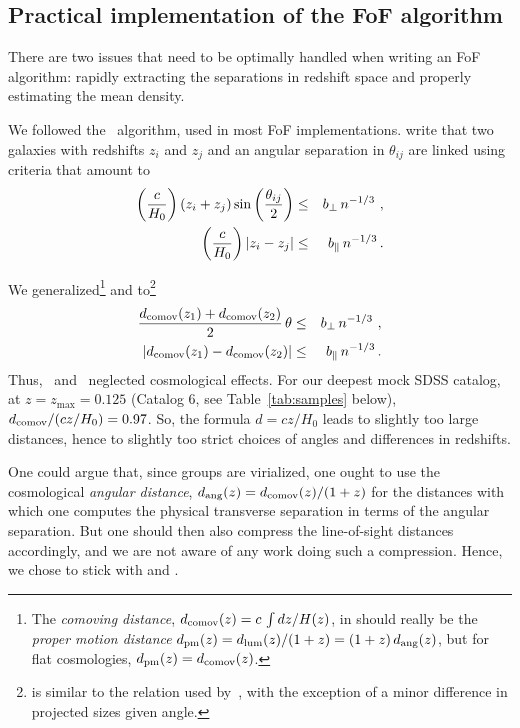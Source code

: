\subsection{Practical implementation of the FoF algorithm}
\label{sec:algo}

There are two issues that need to be optimally handled when writing an FoF
algorithm: rapidly extracting the separations in redshift space and properly
estimating the mean density.

We followed the~\cite{HG82} algorithm, used in most FoF implementations.
\citeauthor{HG82} write that two galaxies with redshifts $z_i$ and $z_j$ and an
angular separation in $\theta_{ij}$ are linked using criteria that amount to
%
\begin{eqnarray}\label{eq:crit1}
    \left({c \over H_0}\right)\left(z_i + z_j\right)\sin\left({\theta_{ij}\over2}\right)
    & \leq & b_\bot \, n^{-1/3} \ , \\
\label{eq:crit2}
    \left({c \over H_0}\right)\left|z_i-z_j\right| &\leq & b_\parallel
    \, n^{-1/3}
\,.
\end{eqnarray}
%

We generalized\footnote{The \emph{comoving distance}, $d_{\rm comov}(z) =
    c\,\int dz/H(z)$, in  should really be the
    \emph{proper motion distance} $d_{\rm pm} (z) = d_{\rm lum}(z)/(1+z) =
    (1+z) \,d_{\rm ang}(z)$, but for flat cosmologies, $d_{\rm pm}(z) = d_{\rm
comov}(z)$.}  and 
to\footnote{ is similar to the relation used
    by~\cite{Zandivarez+14}, with the exception of a minor difference in
projected sizes given angle.}
%
\begin{eqnarray}
    {d_{\rm comov}(z_1) + d_{\rm comov}(z_2)\over 2}\,\theta
    &\leq&  b_\perp\,  n^{-1/3} \ ,
    \label{eq:thetamax}
\\
|d_{\rm comov}(z_1)-d_{\rm comov}(z_2)| &\leq&
b_\parallel\, n^{-1/3} \,.
\label{eq:deltadmax}
\end{eqnarray}
%
Thus,~\cite{HG82} and~\cite{Berlind+06} neglected cosmological effects. For our
deepest mock SDSS catalog, at $z = z_{ \max } = 0.125$ (Catalog 6, see
Table~\ref{tab:samples} below), $d_{\rm comov}/(cz/H_0) = 0.97$. So, the
formula $d=c z/H_0$ leads to slightly too large distances, hence to slightly
too strict choices of angles and differences in redshifts.

One could argue that, since groups are virialized, one ought to use the
cosmological \emph{angular distance}, $d_{\rm ang}(z) = d_{\rm comov}(z)/(1+z)$
for the distances with which one computes the physical transverse separation in
terms of the angular separation. But one should then also compress the
line-of-sight distances accordingly, and we are not aware of any work doing
such a compression. Hence, we chose to stick with 
and .

